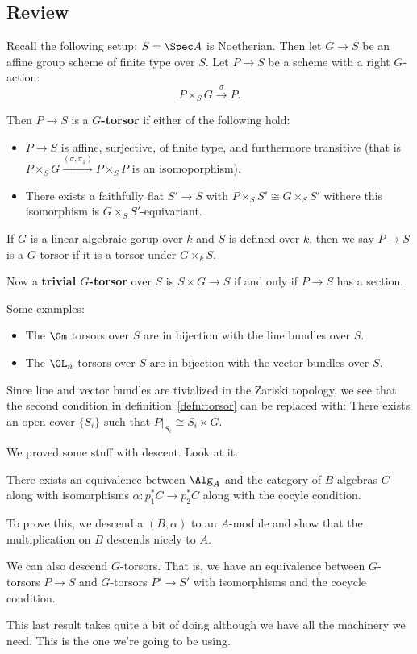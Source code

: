 \documentclass[12pt]{article}
\begin{document}
\subsection{Review}
Recall the following setup: $S=\Spec A$ is Noetherian. Then let $G\to S$ be an affine group scheme of finite type over $S$. Let $P\to S$ 
be a scheme with a right $G$-action:
\[P\times_S G\xrightarrow{\sigma}P.\]
\begin{defn}\label{defn:torsor}
	Then $P\to S$ is a \textbf{$G$-torsor} if either of the following hold:
	\begin{itemize}
		\item $P\to S$ is affine, surjective, of finite type, and furthermore transitive (that is $P\times_S G\xrightarrow{(\sigma,\pi_1)}P\times_SP$ is an isomoporphism).
		\item There exists a faithfully flat $S'\to S$ with $P\times_S S'\cong G\times_S S'$ withere this isomorphism is $G\times_S S'$-equivariant.
	\end{itemize}
\end{defn}
\begin{rmk}
	If $G$ is a linear algebraic gorup over $k$ and $S$ is defined over $k$, then we say $P\to S$ is a $G$-torsor if it is a torsor under $G\times_k S$.
\end{rmk}

Now a \textbf{trivial $G$-torsor} over $S$ is $S\times G\to S$ if and only if $P\to S$ has a section. 

Some examples:
\begin{itemize}
	\item The $\Gm$ torsors over $S$ are in bijection with the line bundles over $S$.
	\item The $\GL_n$ torsors over $S$ are in bijection with the vector bundles over $S$.
\end{itemize}
Since line and vector bundles are tivialized in the Zariski topology, we see that the second condition in definition~\ref{defn:torsor} can be replaced with: 
There exists an open cover $\{S_i\}$ such that $P|_{S_i}\cong S_i\times G$.

\brk

We proved some stuff with descent. Look at it.
\begin{cor}
There exists an equivalence between $\Alg_A$ and the category of $B$ algebras $C$ along with isomorphisms $\alpha:p_1^\ast C\to p_2^\ast C$ along with the cocyle condition.
\end{cor}
\begin{rmk}
	To prove this, we descend a $(B,\alpha)$ to an $A$-module and show that the multiplication on $B$ descends nicely to $A$.
\end{rmk}
\begin{cor}
	We can also descend $G$-torsors. That is, we have an equivalence between $G$-torsors $P\to S$ and $G$-torsors $P'\to S'$ with isomorphisms and the cocycle condition.
\end{cor}
This last result takes quite a bit of doing although we have all the machinery we need. This is the 
one we're going to be using.
\end{document}
